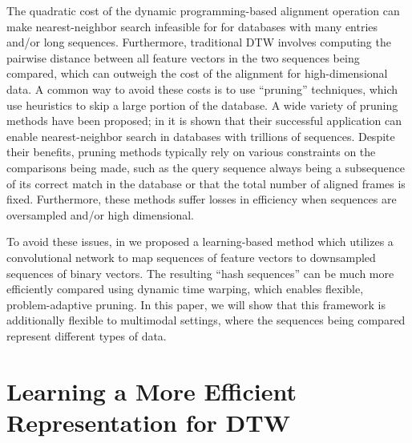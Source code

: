 \documentclass{article} %
\begin{document}
The quadratic cost of the dynamic programming-based alignment operation can make nearest-neighbor search infeasible for for databases with many entries and/or long sequences.
Furthermore, traditional DTW involves computing the pairwise distance between all feature vectors in the two sequences being compared, which can outweigh the cost of the alignment for high-dimensional data.
A common way to avoid these costs is to use ``pruning'' techniques, which use heuristics to skip a large portion of the database.
A wide variety of pruning methods have been proposed; in \cite{rakthanmanon2012searching} it is shown that their successful application can enable nearest-neighbor search in databases with trillions of sequences.
Despite their benefits, pruning methods typically rely on various constraints on the comparisons being made, such as the query sequence always being a subsequence of its correct match in the database or that the total number of aligned frames is fixed.
Furthermore, these methods suffer losses in efficiency when sequences are oversampled and/or high dimensional.

To avoid these issues, in \cite{raffel2015large} we proposed a learning-based method which utilizes a convolutional network to map sequences of feature vectors to downsampled sequences of binary vectors.
The resulting ``hash sequences'' can be much more efficiently compared using dynamic time warping, which enables flexible, problem-adaptive pruning.
In this paper, we will show that this framework is additionally flexible to multimodal settings, where the sequences being compared represent different types of data.

\section{Learning a More Efficient Representation for DTW}
\end{document}
